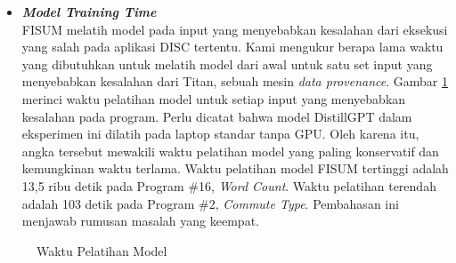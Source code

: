 \begin{itemize}
  \item \emph{\textbf{Model Training Time}} \\
  FISUM melatih model pada input yang menyebabkan 
  kesalahan dari eksekusi yang salah pada aplikasi 
  DISC tertentu. Kami mengukur berapa lama waktu 
  yang dibutuhkan untuk melatih model dari awal 
  untuk satu set input yang menyebabkan kesalahan 
  dari Titan, sebuah mesin \emph{data provenance}. 
  Gambar \ref{tb:HasilPengujianTrainTime}
  merinci waktu pelatihan model untuk setiap 
  input yang menyebabkan kesalahan pada program. 
  Perlu dicatat bahwa model DistillGPT dalam 
  eksperimen ini dilatih pada laptop standar tanpa 
  GPU. Oleh karena itu, angka tersebut mewakili 
  waktu pelatihan model yang paling konservatif 
  dan kemungkinan waktu terlama. Waktu pelatihan 
  model FISUM tertinggi adalah 13,5 ribu detik 
  pada Program \#16, \emph{Word Count}. 
  Waktu pelatihan terendah adalah 103 detik 
  pada Program \#2, \emph{Commute Type}.
  Pembahasan ini menjawab rumusan masalah yang keempat.
\end{itemize}

\begin{figure}[H]
      \centering
      \caption{Waktu Pelatihan Model}
      \label{tb:HasilPengujianTrainTime}
\end{figure}
  

